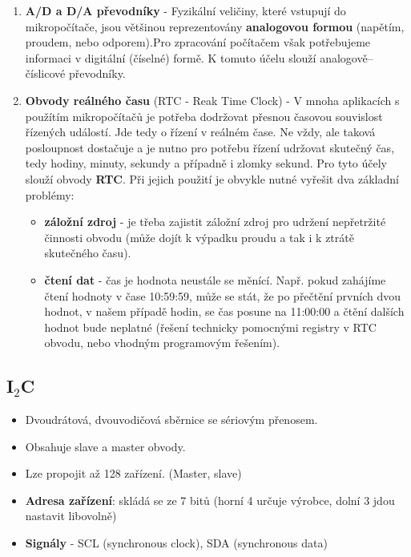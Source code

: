\begin{enumerate}
\item \textbf{A/D a D/A převodníky} - Fyzikální veličiny, které vstupují do mikropočítače, jsou většinou reprezentovány
\textbf{analogovou formou} (napětím, proudem, nebo odporem).Pro zpracování počítačem však potřebujeme informaci v digitální (číselné) formě. K tomuto účelu slouží analogově–číslicové převodníky.
\item \textbf{Obvody reálného času} (RTC - Reak Time Clock) - V mnoha aplikacích s použítím mikropočítačů je potřeba dodržovat přesnou časovou souvislost řízených událostí. Jde tedy o řízení v reálném čase. Ne vždy, ale taková posloupnost dostačuje a je nutno pro potřebu řízení udržovat skutečný čas, tedy hodiny, minuty, sekundy a případně i zlomky sekund. Pro tyto účely slouží obvody \textbf{RTC}. Při jejich použití je obvykle nutné vyřešit dva základní problémy:
\begin{itemize}
\item \textbf{záložní zdroj} - je třeba zajistit záložní zdroj pro udržení nepřetržité činnosti obvodu (může dojít k výpadku proudu a tak i k ztrátě skutečného času).
\item \textbf{čtení dat} - čas je hodnota neustále se měnící. Např. pokud zahájíme čtení hodnoty v čase 10:59:59, může se stát, že po přečtění prvních dvou hodnot, v našem případě hodin, se čas posune na 11:00:00 a čtění dalších hodnot bude neplatné (řešení technicky pomocnými registry v RTC obvodu, nebo vhodným programovým řešením). 
\end{itemize}
\end{enumerate}


\subsection*{I$_2$C}
\begin{itemize}
\item Dvoudrátová, dvouvodičová sběrnice se sériovým přenosem.
\item Obsahuje slave a master obvody.
\item Lze propojit až 128 zařízení. (Master, slave)
\item \textbf{Adresa zařízení}: skládá se ze 7 bitů (horní 4 určuje výrobce, dolní 3 jdou nastavit libovolně)
\item \textbf{Signály} - SCL (synchronous clock), SDA (synchronous data)
\end{itemize}